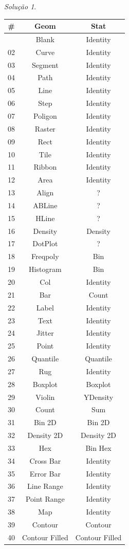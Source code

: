 \documentclass[
]{latex/krantz}
\theoremstyle{definition}
\theoremstyle{definition}
\theoremstyle{definition}
\theoremstyle{definition}
\theoremstyle{remark}
\newtheorem*{solution}{Solução}
\begin{document}
\begin{solution}
\leavevmode

\begin{longtable}[]{@{}ccc@{}}
\toprule\noalign{}
\# & Geom & Stat \\
\midrule\noalign{}
\endhead
\bottomrule\noalign{}
\endlastfoot
01 & Blank & Identity \\
02 & Curve & Identity \\
03 & Segment & Identity \\
04 & Path & Identity \\
05 & Line & Identity \\
06 & Step & Identity \\
07 & Poligon & Identity \\
08 & Raster & Identity \\
09 & Rect & Identity \\
10 & Tile & Identity \\
11 & Ribbon & Identity \\
12 & Area & Identity \\
13 & Align & ? \\
14 & ABLine & ? \\
15 & HLine & ? \\
16 & Density & Density \\
17 & DotPlot & ? \\
18 & Freqpoly & Bin \\
19 & Histogram & Bin \\
20 & Col & Identity \\
21 & Bar & Count \\
22 & Label & Identity \\
23 & Text & Identity \\
24 & Jitter & Identity \\
25 & Point & Identity \\
26 & Quantile & Quantile \\
27 & Rug & Identity \\
28 & Boxplot & Boxplot \\
29 & Violin & YDensity \\
30 & Count & Sum \\
31 & Bin 2D & Bin 2D \\
32 & Density 2D & Density 2D \\
33 & Hex & Bin Hex \\
34 & Cross Bar & Identity \\
35 & Error Bar & Identity \\
36 & Line Range & Identity \\
37 & Point Range & Identity \\
38 & Map & Identity \\
39 & Contour & Contour \\
40 & Contour Filled & Contour Filled \\
\end{longtable}

\end{solution}
\end{document}
